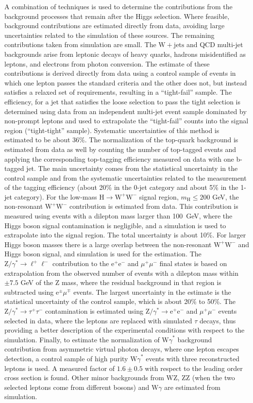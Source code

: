 \documentclass{PoS}
\newcommand{\Hi}{\ensuremath{\mathrm{H}}}
\newcommand{\W}{\ensuremath{\mathrm{W}}}
\newcommand{\Wjets}{\ensuremath{\mathrm{W+jets}}}
\newcommand{\WW}{\ensuremath{\W^+\W^-}}
\newcommand{\Z}{\ensuremath{\mathrm{Z}}}
\newcommand{\ZZ}{\ensuremath{\Z\Z}}
\newcommand{\WZ}{\ensuremath{\W\Z}}
\newcommand{\Elp}{\ensuremath{\mathrm{\mathrm{e}}^{+}}}
\newcommand{\Elm}{\ensuremath{\mathrm{\mathrm{e}}^{-}}}
\newcommand{\Elpm}{\ensuremath{\mathrm{\mathrm{e}}^{\pm}}}
\newcommand{\Mp}{\ensuremath{\mu^{+}}}
\newcommand{\Mm}{\ensuremath{\mu^{-}}}
\newcommand{\Mmp}{\ensuremath{\mu^{\mp}}}
\newcommand{\Tau}{\ensuremath{\tau}}
\newcommand{\mHi}{\ensuremath{m_{\mathrm{H}}}}
\newcommand{\GAMMA}{\ensuremath{\gamma}}
\newcommand{\dyee}{\ensuremath{\mathrm{\Z}/\GAMMA^*\mathrm{\to e^+e^-}}}
\newcommand{\dytt}{\ensuremath{\mathrm{\Z}/\GAMMA^* \to\tau^+\tau^-}}
\newcommand{\dyll}{\ensuremath{\mathrm{\Z}/\GAMMA^*\mathrm{\to \ell^+\ell^-}}}
\newcommand{\hww}{\Hi\to\WW}
\newcommand{\wgamma}{\ensuremath{\W\GAMMA}}
\begin{document}
A combination of techniques is used to determine the contributions
from the background processes that remain after the Higgs selection.
Where feasible, background contributions are estimated directly from
data, avoiding large uncertainties related to the simulation of these
sources. The remaining contributions taken from simulation are small.
The $\Wjets$ and QCD multi-jet backgrounds arise from leptonic decays
of heavy quarks, hadrons misidentified as leptons, and electrons from
photon conversion. The estimate of these contributions is derived
directly from data using a control sample of events in which one
lepton passes the standard criteria and the other does not, but
instead satisfies a relaxed set of requirements, resulting in a
``tight-fail'' sample. The efficiency, for a jet that satisfies the
loose selection to pass the tight selection is determined using data
from an independent multi-jet event sample dominated by non-prompt
leptons and used to extrapolate the ``tight-fail'' counts into the
signal region (``tight-tight'' sample).  Systematic uncertainties of
this method is estimated to be about 36\%.  The normalization of the
top-quark background is estimated from data as well by counting the
number of top-tagged events and applying the corresponding top-tagging
efficiency measured on data with one b-tagged jet.  The main
uncertainty comes from the statistical uncertainty in the control
sample and from the systematic uncertainties related to the
measurement of the tagging efficiency (about 20\% in the 0-jet
category and about 5\% in the 1-jet category).  For the low-mass
$\hww$ signal region, $\mHi \leq 200$ GeV, the non-resonant $\WW$
contribution is estimated from data. This contribution is measured
using events with a dilepton mass larger than 100~GeV, where the Higgs
boson signal contamination is negligible, and a simulation is used to
extrapolate into the signal region. The total uncertainty is about
10\%.  For larger Higgs boson masses there is a large overlap between
the non-resonant $\WW$ and Higgs boson signal, and simulation is used
for the estimation.  The $\dyll$ contribution to the $\Elp\Elm$ and
$\Mp\Mm$ final states is based on extrapolation from the observed
number of events with a dilepton mass within $\pm7.5$ GeV of the $\Z$
mass, where the residual background in that region is subtracted using
$\Elpm\Mmp$ events.  The largest uncertainty in the estimate is the
statistical uncertainty of the control sample, which is about 20\% to
50\%.  The $\dytt$ contamination is estimated using $\dyee$ and
$\Mp\Mm$ events selected in data, where the leptons are replaced with
simulated $\Tau$ decays, thus providing a better description of the
experimental conditions with respect to the simulation.  Finally, to
estimate the normalization of $\wgamma^{*}$ background contribution
from asymmetric virtual photon decays, where one lepton escapes
detection, a control sample of high purity $\wgamma^{*}$ events with
three reconstructed leptons is used. A measured factor of $1.6\pm0.5$
with respect to the leading order cross section is found.  Other minor
backgrounds from $\WZ$, $\ZZ$ (when the two selected leptons come from
different bosons) and $\wgamma$ are estimated from simulation.
\end{document}
